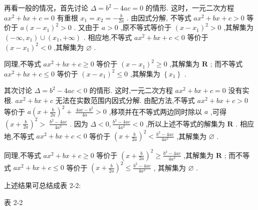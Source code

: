 \documentclass[10pt]{article}
\begin{document}
再看一般的情况，首先讨论 \(\Delta  = {b}^{2} - {4ac} = 0\) 的情形. 这时，一元二次方程 \(a{x}^{2} + {bx} + c = 0\) 有重根 \({x}_{1} = {x}_{2} =  - \frac{b}{2a}\) . 由因式分解, 不等式 \(a{x}^{2} + {bx} + c > 0\) 等价于 \(a{\left( x - {x}_{1}\right) }^{2} > 0\) . 又由于 \(a > 0\) ,原不等式等价于 \({\left( x - {x}_{1}\right) }^{2} > 0\) ,其解集为 \(\left( {-\infty ,{x}_{1}}\right)  \cup  \left( {{x}_{1}, + \infty }\right)\) . 相应地,不等式 \(a{x}^{2} + {bx} + c < 0\) 等价于 \({\left( x - {x}_{1}\right) }^{2} < 0\) ,其解集为 \(\varnothing\) .

同理,不等式 \(a{x}^{2} + {bx} + c \geq  0\) 等价于 \({\left( x - {x}_{1}\right) }^{2} \geq  0\) ,其解集为 \(\mathbf{R}\) ; 而不等式 \(a{x}^{2} + {bx} + c \leq  0\) 等价于 \({\left( x - {x}_{1}\right) }^{2} \leq  0\) ,其解集为 \(\left\{  {x}_{1}\right\}\) .

其次讨论 \(\Delta  = {b}^{2} - {4ac} < 0\) 的情形. 这时,一元二次方程 \(a{x}^{2} + {bx} + c = 0\) 没有实根. \(a{x}^{2} + {bx} + c\) 无法在实数范围内因式分解. 由配方法,不等式 \(a{x}^{2} + {bx} + c > 0\) 等价于 \(a{\left( x + \frac{b}{2a}\right) }^{2} + \; \frac{{4ac} - {b}^{2}}{4a} > 0\) ,移项并在不等式两边同时除以 \(a\) ,可得 \({\left( x + \frac{b}{2a}\right) }^{2} > \; \frac{{b}^{2} - {4ac}}{4{a}^{2}}\) . 因为 \(\Delta  < 0,\frac{{b}^{2} - {4ac}}{4{a}^{2}} < 0\) ,所以上述不等式的解集为 \(\mathbf{R}\) . 相应地,不等式 \(a{x}^{2} + {bx} + c < 0\) 等价于 \({\left( x + \frac{b}{2a}\right) }^{2} < \frac{{b}^{2} - {4ac}}{4{a}^{2}}\) ,其解集为 \(\varnothing\) .

同理,不等式 \(a{x}^{2} + {bx} + c \geq  0\) 等价于 \({\left( x + \frac{b}{2a}\right) }^{2} \geq  \frac{{b}^{2} - {4ac}}{4{a}^{2}}\) ,其解集为 \(\mathbf{R}\) ; 而不等式 \(a{x}^{2} + {bx} + c \leq  0\) 等价于 \({\left( x + \frac{b}{2a}\right) }^{2} \leq  \frac{{b}^{2} - {4ac}}{4{a}^{2}}\) , 其解集为 \(\varnothing\) .

上述结果可总结成表 2-2:



表 2-2

\begin{center}
\end{center}
\end{document}
